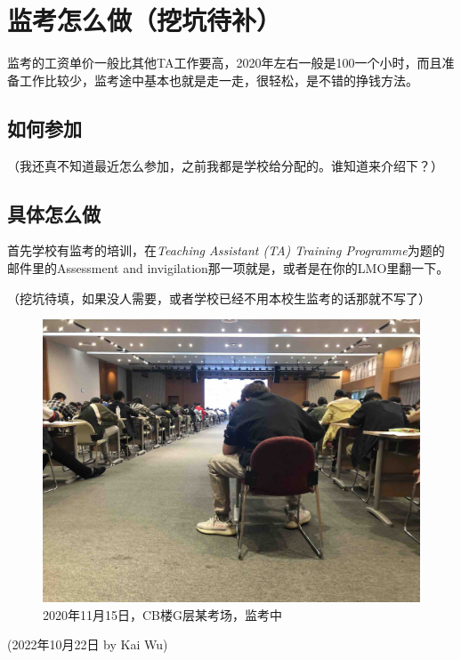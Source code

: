 \section{监考怎么做（挖坑待补）}

监考的工资单价一般比其他TA工作要高，2020年左右一般是100一个小时，而且准备工作比较少，监考途中基本也就是走一走，很轻松，是不错的挣钱方法。

\subsection{如何参加}
（我还真不知道最近怎么参加，之前我都是学校给分配的。谁知道来介绍下？）

\subsection{具体怎么做}
首先学校有监考的培训，在\textit{Teaching Assistant (TA) Training Programme}为题的邮件里的Assessment and invigilation那一项就是，或者是在你的LMO里翻一下。

（挖坑待填，如果没人需要，或者学校已经不用本校生监考的话那就不写了）

\begin{figure}[H]
    \centering
    \includegraphics[width=\columnwidth]{author-folder/Kai.Wu/invigilation.jpg}
    \caption{2020年11月15日，CB楼G层某考场，监考中}
\end{figure}

\begin{flushright}
(2022年10月22日 by Kai Wu)
\end{flushright}

